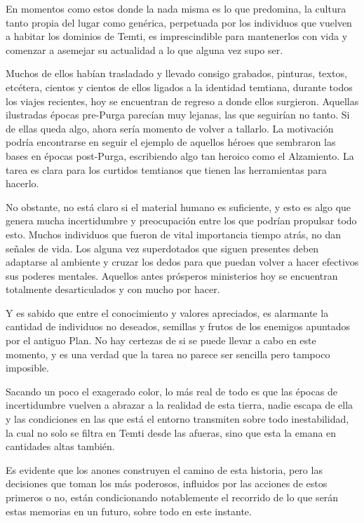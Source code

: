 \documentclass[
]{book}
\begin{document}
En momentos como estos donde la nada misma es lo que predomina, la cultura tanto propia del lugar como genérica, perpetuada por los individuos que vuelven a habitar los dominios de Temti, es imprescindible para mantenerlos con vida y comenzar a asemejar su actualidad a lo que alguna vez supo ser.

Muchos de ellos habían trasladado y llevado consigo grabados, pinturas, textos, etcétera, cientos y cientos de ellos ligados a la identidad temtiana, durante todos los viajes recientes, hoy se encuentran de regreso a donde ellos surgieron. Aquellas ilustradas épocas pre-Purga parecían muy lejanas, las que seguirían no tanto. Si de ellas queda algo, ahora sería momento de volver a tallarlo. La motivación podría encontrarse en seguir el ejemplo de aquellos héroes que sembraron las bases en épocas post-Purga, escribiendo algo tan heroico como el Alzamiento. La tarea es clara para los curtidos temtianos que tienen las herramientas para hacerlo.

No obstante, no está claro si el material humano es suficiente, y esto es algo que genera mucha incertidumbre y preocupación entre los que podrían propulsar todo esto. Muchos individuos que fueron de vital importancia tiempo atrás, no dan señales de vida. Los alguna vez superdotados que siguen presentes deben adaptarse al ambiente y cruzar los dedos para que puedan volver a hacer efectivos sus poderes mentales. Aquellos antes prósperos ministerios hoy se encuentran totalmente desarticulados y con mucho por hacer.

Y es sabido que entre el conocimiento y valores apreciados, es alarmante la cantidad de individuos no deseados, semillas y frutos de los enemigos apuntados por el antiguo Plan. No hay certezas de si se puede llevar a cabo en este momento, y es una verdad que la tarea no parece ser sencilla pero tampoco imposible.

Sacando un poco el exagerado color, lo más real de todo es que las épocas de incertidumbre vuelven a abrazar a la realidad de esta tierra, nadie escapa de ella y las condiciones en las que está el entorno transmiten sobre todo inestabilidad, la cual no solo se filtra en Temti desde las afueras, sino que esta la emana en cantidades altas también.

Es evidente que los anones construyen el camino de esta historia, pero las decisiones que toman los más poderosos, influidos por las acciones de estos primeros o no, están condicionando notablemente el recorrido de lo que serán estas memorias en un futuro, sobre todo en este instante.
\end{document}
